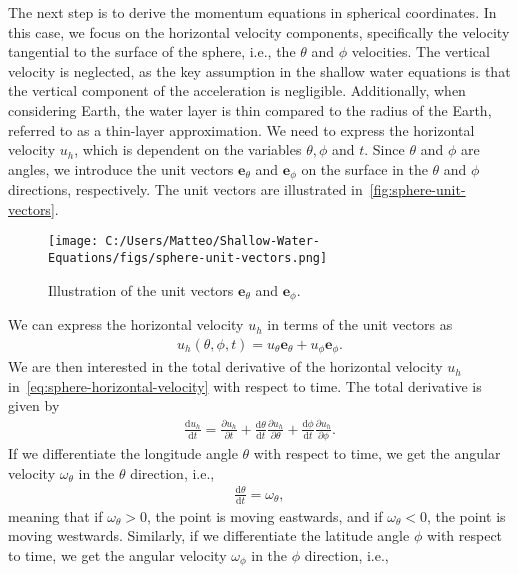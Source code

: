 The next step is to derive the momentum equations in spherical coordinates.
In this case, we focus on the horizontal velocity components, specifically the velocity tangential to the surface of the sphere, i.e., the $\theta$ and $\phi$ velocities.
The vertical velocity is neglected, as the key assumption in the shallow water equations is that the vertical component of the acceleration is negligible.
Additionally, when considering Earth, the water layer is thin compared to the radius of the Earth, referred to as a thin-layer approximation.
We need to express the horizontal velocity $u_h$, which is dependent on the variables $\theta, \phi$ and $t$.
Since $\theta$ and $\phi$ are angles, we introduce the unit vectors $\mathbf{e}_\theta$ and $\mathbf{e}_\phi$ on the surface in the $\theta$ and $\phi$ directions, respectively.
The unit vectors are illustrated in~\autoref{fig:sphere-unit-vectors}.
\begin{figure}[H]
    \centering
    \texttt{[image: C:/Users/Matteo/Shallow-Water-Equations/figs/sphere-unit-vectors.png]}
    \caption{Illustration of the unit vectors $\mathbf{e}_\theta$ and $\mathbf{e}_\phi$.}\label{fig:sphere-unit-vectors}
\end{figure}
We can express the horizontal velocity $u_h$ in terms of the unit vectors as
\begin{align}\label{eq:sphere-horizontal-velocity}
    u_h(\theta, \phi, t) = u_\theta \mathbf{e}_\theta + u_\phi \mathbf{e}_\phi.
\end{align}
We are then interested in the total derivative of the horizontal velocity $u_h$ in~\eqref{eq:sphere-horizontal-velocity} with respect to time.
The total derivative is given by
\begin{align}\label{eq:sphere-total-derivative}
    \frac{\text{d}u_h}{\text{d}t} = \frac{\partial u_h}{\partial t} + \frac{\text{d}\theta}{\text{d}t} \frac{\partial u_h}{\partial \theta} + \frac{\text{d}\phi}{\text{d}t} \frac{\partial u_h}{\partial \phi}.
\end{align}
If we differentiate the longitude angle $\theta$ with respect to time, we get the angular velocity $\omega_\theta$ in the $\theta$ direction, i.e.,
\begin{align*}
    \frac{\text{d}\theta}{\text{d}t} = \omega_\theta,
\end{align*}
meaning that if $\omega_\theta > 0$, the point is moving eastwards, and if $\omega_\theta < 0$, the point is moving westwards.
Similarly, if we differentiate the latitude angle $\phi$ with respect to time, we get the angular velocity $\omega_\phi$ in the $\phi$ direction, i.e.,
